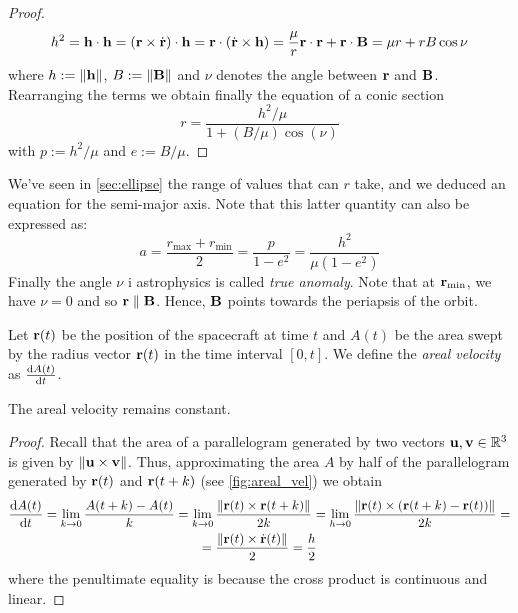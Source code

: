 \documentclass[../main.tex]{subfiles}
\begin{document}
\begin{proof}
  \begin{equation}
    h^2=\boldsymbol{\mathrm{h}}\cdot\boldsymbol{\mathrm{h}}=(\boldsymbol{\mathrm{r}}\times\dot{\boldsymbol{\mathrm{r}}})\cdot\boldsymbol{\mathrm{h}}=\boldsymbol{\mathrm{r}}\cdot(\dot{\boldsymbol{\mathrm{r}}}\times\boldsymbol{\mathrm{h}})=\frac{\mu}{r}\boldsymbol{\mathrm{r}}\cdot\boldsymbol{\mathrm{r}}+\boldsymbol{\mathrm{r}}\cdot\boldsymbol{\mathrm{B}}=\mu r+rB\cos\nu
  \end{equation}
  where $h:=\left\|\boldsymbol{\mathrm{h}}\right\|$, $B:=\left\|\boldsymbol{\mathrm{B}}\right\|$ and $\nu$ denotes the angle between $\boldsymbol{\mathrm{r}}$ and $\boldsymbol{\mathrm{B}}$. Rearranging the terms we obtain finally the equation of a conic section
  \begin{equation}\label{eq:r_conic}
    r=\frac{h^2/\mu}{1+(B/\mu)\cos(\nu)}
  \end{equation}
  with $p:=h^2/\mu$ and $e:=B/\mu$.
\end{proof}
We've seen in \cref{sec:ellipse} the range of values that can $r$ take, and we deduced an equation for the semi-major axis. Note that this latter quantity can also be expressed as:
\begin{equation}\label{eq:semi-major_axis}
  a=\frac{r_\mathrm{max}+r_\mathrm{min}}{2}=\frac{p}{1-e^2}=\frac{h^2}{\mu(1-e^2)}
\end{equation}
Finally the angle $\nu$ i  astrophysics is called \emph{true anomaly}. Note that at $\boldsymbol{\mathrm{r}}_\mathrm{min}$, we have $\nu=0$ and so $\boldsymbol{\mathrm{r}}\parallel\boldsymbol{\mathrm{B}}$. Hence, $\boldsymbol{\mathrm{B}}$ points towards the periapsis of the orbit.
\begin{definition}
  Let $\boldsymbol{\mathrm{r}}(t)$ be the position of the spacecraft at time $t$ and $A(t)$ be the area swept by the radius vector $\boldsymbol{\mathrm{r}}(t)$ in the time interval $[0,t]$. We define the \emph{areal velocity} as $\dv{A(t)}{t}$.
\end{definition}
\begin{proposition}
  The areal velocity remains constant.
\end{proposition}
\begin{proof}
  Recall that the area of a parallelogram generated by two vectors $\boldsymbol{\mathrm{u}},\boldsymbol{\mathrm{v}}\in\mathbb{R}^3$ is given by $\left\|\boldsymbol{\mathrm{u}}\times\boldsymbol{\mathrm{v}}\right\|$. Thus, approximating the area $A$ by half of the parallelogram generated by $\boldsymbol{\mathrm{r}}(t)$ and ${\boldsymbol{\mathrm{r}}}(t+k)$ (see \cref{fig:areal_vel}) we obtain
  \begin{multline}\label{eq:areal_velocity}
    \dv{A(t)}{t}=\lim_{k\to 0}\frac{A(t+k)-A(t)}{k}=\lim_{k\to 0}\frac{\left\|\boldsymbol{\mathrm{r}}(t)\times\boldsymbol{\mathrm{r}}(t+k)\right\|}{2k}=\lim_{h\to 0}\frac{\left\|\boldsymbol{\mathrm{r}}(t)\times(\boldsymbol{\mathrm{r}}(t+k)-\boldsymbol{\mathrm{r}}(t))\right\|}{2k}=\\
    =\frac{\left\|\boldsymbol{\mathrm{r}}(t)\times\dot{\boldsymbol{\mathrm{r}}}(t)\right\|}{2}=\frac{h}{2}
  \end{multline}
  where the penultimate equality is because the cross product is continuous and linear.
\end{proof}
\end{document}
